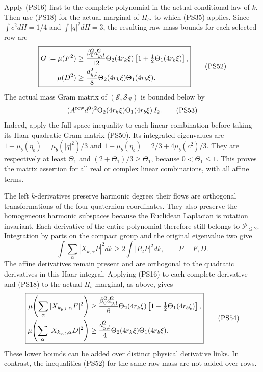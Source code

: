 \documentclass[11pt]{article}
\begin{document}
Apply (PS16) first to the complete polynomial in the actual
conditional law of \(k\). Then use (PS18) for the actual marginal
of \(H_b\), to which (PS35) applies. Since
\(\int c^2dH=1/4\) and \(\int|q|^2dH=3\), the resulting raw
mass bounds for each selected row are
\[
 \boxed{\begin{aligned}
 G:=\mu(F^2)&\ge{\beta_0^2d_{y,l}^2\over12}
       \Theta_2(4r_k\xi)
                   \left[1+\tfrac12\Theta_1(4r_b\xi)\right],\\
 \mu(D^2)&\ge{d_{y,l}^2\over8}
                   \Theta_2(4r_k\xi)\Theta_1(4r_b\xi).
 \end{aligned}}
 \tag{PS52}
\]
The actual mass Gram matrix of
\((\mathcal S,\mathcal S_{\mathcal R})\) is bounded below by
\[
 (A^{\rm row}d^0)^2
          \Theta_2(4r_k\xi)\Theta_1(4r_b\xi)\,I_2.
 \tag{PS53}
\]
Indeed, apply the full-space inequality to each linear combination
before taking its Haar quadratic Gram matrix (PS50). Its integrated
eigenvalues are \(1-\mu_b(\eta_b)=\mu_b(|q|^2)/3\) and
\(1+\mu_b(\eta_b)=2/3+4\mu_b(c^2)/3\). They are respectively at
least \(\Theta_1\) and \((2+\Theta_1)/3\ge\Theta_1\),
because \(0<\Theta_1\le1\). This proves the matrix assertion for
all real or complex linear combinations, with all affine terms.

The left \(k\)-derivatives preserve harmonic degree: their flows
are orthogonal transformations of the four quaternion coordinates.
They also preserve the homogeneous harmonic subspaces because
the Euclidean Laplacian is rotation invariant. Each derivative of
the entire polynomial therefore still belongs to
\(\mathcal P_{\le2}\). Integration by parts on the compact group
and the original eigenvalue two give
\[
 \int\sum_\alpha|X_{k,\alpha}P|^2dk
 \ge2\int|P_2P|^2dk,\qquad P=F,D.
 \]
The affine derivatives remain present and are orthogonal to the
quadratic derivatives in this Haar integral. Applying (PS16) to
each complete derivative and (PS18) to the actual \(H_b\)
marginal, as above, gives
\[
 \boxed{\begin{aligned}
 \mu\!\left(\sum_\alpha|X_{k_{y,l},\alpha}F|^2\right)
 &\ge{\beta_0^2d_{y,l}^2\over6}\Theta_2(4r_k\xi)
                   \left[1+\tfrac12\Theta_1(4r_b\xi)\right],\\
 \mu\!\left(\sum_\alpha|X_{k_{y,l},\alpha}D|^2\right)
 &\ge{d_{y,l}^2\over4}
                    \Theta_2(4r_k\xi)\Theta_1(4r_b\xi).
 \end{aligned}}
 \tag{PS54}
\]
These lower bounds can be added over distinct physical derivative
links. In contrast, the inequalities (PS52) for the same raw
mass are not added over rows.
\end{document}
